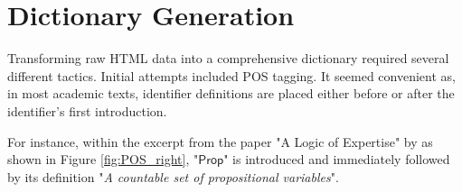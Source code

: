 \begin{table}[htpb]
  \centering
  \quad 
  \caption[Token Usages]{Token usages of different types of encoding}
  \label{fig:ascii-math}
\end{table}



\section{Dictionary Generation}\label{sec:dic-generation}

Transforming raw HTML data into a comprehensive dictionary required several different tactics. Initial attempts included \ac{POS} tagging. It seemed convenient as, in most academic texts, identifier definitions are placed either before or after the identifier's first introduction.

For instance, within the excerpt from the paper "A Logic of Expertise" by  \citet{singleton2021logic} as shown in Figure \ref{fig:POS_right}, "$\mathsf{Prop}$" is introduced and immediately followed by its definition "\textit{A countable set of propositional variables}".

